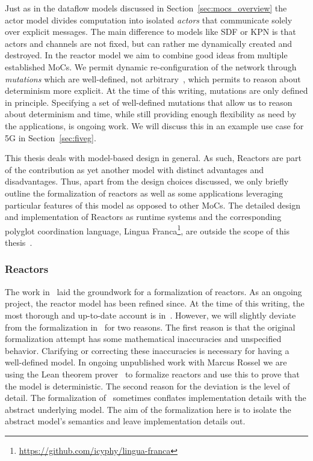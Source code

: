 Just as in the dataflow models discussed in Section~\ref{sec:mocs_overview} the actor model divides computation into isolated \emph{actors} that communicate solely over explicit messages.
The main difference to models like \ac{SDF} or \ac{KPN} is that actors and channels are not fixed, but can rather me dynamically created and destroyed.
In the reactor model we aim to combine good ideas from multiple established \acp{MoC}.
We permit dynamic re-configuration of the network through \emph{mutations} which are well-defined, not arbitrary~\cite{lohstroh_cyphy19}, which permits to reason about determinism more explicit. 
At the time of this writing, mutations are only defined in principle.
Specifying a set of well-defined mutations that allow us to reason about determinism and time, while still providing enough flexibility as need by the applications, is ongoing work.
We will discuss this in an example use case for 5G in Section~\ref{sec:fiveg}.

This thesis deals with model-based design in general. As such, Reactors are part of the contribution as yet another model with distinct advantages and disadvantages.
Thus, apart from the design choices discussed, we only briefly outline the formalization of reactors as well as some applications leveraging particular features of this model as opposed to other \acp{MoC}.
The detailed design and implementation of Reactors as runtime systems and the corresponding polyglot coordination language, Lingua Franca\footnote{\url{https://github.com/icyphy/lingua-franca}}, are outside the scope of this thesis~\cite{lingua_franca,lohstroh_phdthesis}.

\subsubsection{Reactors}

The work in~\cite{lohstroh_cyphy19} laid the groundwork for a formalization of reactors.
As an ongoing project, the reactor model has been refined since. At the time of this writing, the most thorough and up-to-date account is in~\cite{lohstroh_phdthesis}.
However, we will slightly deviate from the formalization in~\cite{lohstroh_cyphy19,lohstroh_phdthesis} for two reasons.
The first reason is that the original formalization attempt has some mathematical inaccuracies and unspecified behavior.
Clarifying or correcting these inaccuracies is necessary for having a well-defined model.
In ongoing unpublished work with Marcus Rossel we are using the Lean theorem prover~\cite{lean} to formalize reactors and use this to prove that the model is deterministic.
The second reason for the deviation is the level of detail. The formalization of~\cite{lohstroh_cyphy19,lohstroh_phdthesis} sometimes conflates implementation details with the abstract underlying model.
The aim of the formalization here is to isolate the abstract model's semantics and leave implementation details out.

